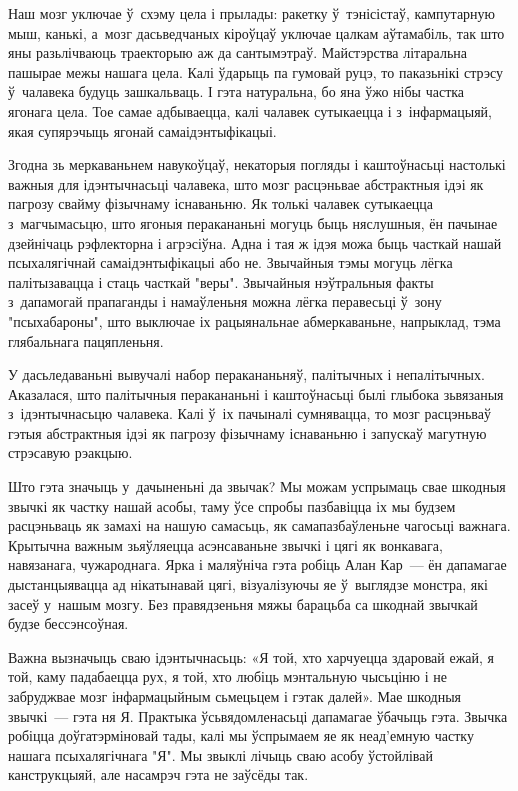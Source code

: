 Наш мозг уключае ў~схэму цела і прылады: ракетку ў~тэнісістаў, кампутарную мыш, канькі, а~мозг дасьведчаных кіроўцаў уключае цалкам аўтамабіль, так што яны разьлічваюць траекторыю аж да сантымэтраў. Майстэрства літаральна пашырае межы нашага цела. Калі ўдарыць па гумовай руцэ, то паказьнікі стрэсу ў~чалавека будуць зашкальваць. І гэта натуральна, бо яна ўжо нібы частка ягонага цела. Тое самае адбываецца, калі чалавек сутыкаецца і з~інфармацыяй, якая супярэчыць ягонай самаідэнтыфікацыі.

Згодна зь меркаваньнем навукоўцаў, некаторыя погляды і каштоўнасьці настолькі важныя для ідэнтычнасьці чалавека, што мозг расцэньвае абстрактныя ідэі як пагрозу свайму фізычнаму існаваньню. Як толькі чалавек сутыкаецца з~магчымасьцю, што ягоныя перакананьні могуць быць няслушныя, ён пачынае дзейнічаць рэфлекторна і агрэсіўна. Адна і тая ж ідэя можа быць часткай нашай псыхалягічнай самаідэнтыфікацыі або не. Звычайныя тэмы могуць лёгка палітызавацца і стаць часткай "веры". Звычайныя нэўтральныя факты з~дапамогай прапаганды і намаўленьня можна лёгка перавесьці ў~зону "псыхабароны", што выключае іх рацыянальнае абмеркаваньне, напрыклад, тэма глябальнага пацяпленьня.

У дасьледаваньні вывучалі набор перакананьняў, палітычных і непалітычных. Аказалася, што палітычныя перакананьні і каштоўнасьці былі глыбока зьвязаныя з~ідэнтычнасьцю чалавека. Калі ў~іх пачыналі сумнявацца, то мозг расцэньваў гэтыя абстрактныя ідэі як пагрозу фізычнаму існаваньню і запускаў магутную стрэсавую рэакцыю.

Што гэта значыць у~дачыненьні да звычак? Мы можам успрымаць свае шкодныя звычкі як частку нашай асобы, таму ўсе спробы пазбавіцца іх мы будзем расцэньваць як замахі на нашую самасьць, як самапазбаўленьне чагосьці важнага. Крытычна важным зьяўляецца асэнсаваньне звычкі і цягі як вонкавага, навязанага, чужароднага. Ярка і маляўніча гэта робіць Алан Кар~--- ён дапамагае дыстанцыявацца ад нікатынавай цягі, візуалізуючы яе ў~выглядзе монстра, які засеў у~нашым мозгу. Без правядзеньня мяжы барацьба са шкоднай звычкай будзе бессэнсоўная.

Важна вызначыць сваю ідэнтычнасьць: «Я той, хто харчуецца здаровай ежай, я той, каму падабаецца рух, я той, хто любіць мэнтальную чысьціню і не забруджвае мозг інфармацыйным сьмецьцем і гэтак далей». Мае шкодныя звычкі~--- гэта ня Я. Практыка ўсьвядомленасьці дапамагае ўбачыць гэта. Звычка робіцца доўгатэрміновай тады, калі мы ўспрымаем яе як неад'емную частку нашага псыхалягічнага "Я". Мы звыклі лічыць сваю асобу ўстойлівай канструкцыяй, але насамрэч гэта не заўсёды так. 

